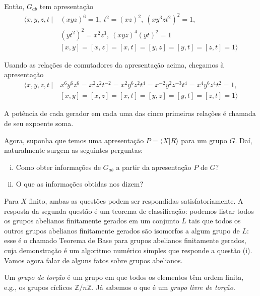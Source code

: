 	\par\vspace{0.3cm} Então, $G_{ab}$ tem apresentação
	\begin{align*}
	\langle x,y,z,t \ | \ &(xyz)^6 = 1, \ t^2 = (xz)^2, \ (xy^3zt^2)^2 = 1, \\ 
	&(yt^2)^2 = x^2z^3, \ (xyz)^4(yt)^2 = 1 \\ 
	&[x,y] = [x,z] = [x,t] = [y,z] = [y,t] = [z,t] = 1\rangle
	\end{align*}
	\par\vspace{0.3cm} Usando as relações de comutadores da apresentação acima, chegamos à apresentação
	\begin{align*}
	\langle x,y,z,t \ | \ &x^6y^6z^6 = x^2z^2t^{-2} = x^2y^6z^2t^4 = x^{-2}y^2z^{-3}t^4 = x^4y^6z^4t^2 = 1, \\
	&[x,y] = [x,z] = [x,t] = [y,z] = [y,t] = [z,t] = 1
	\rangle
	\end{align*}
	\par\vspace{0.3cm} A potência de cada gerador em cada uma das cinco primeiras relações é chamada de seu expoente soma.
	\par\vspace{0.3cm} Agora, suponha que temos uma apresentação $P = \langle X|R \rangle$ para um grupo $G$. Daí, naturalmente surgem as seguintes perguntas:
	\begin{enumerate}[(i)]
		\item Como obter informações de $G_{ab}$ a partir da apresentação $P$ de $G$?
		\item O que as informações obtidas nos dizem? 
	\end{enumerate}
	\par\vspace{0.3cm} Para $X$ finito, ambas as questões podem ser respondidas satisfatoriamente. A resposta da segunda questão é um teorema de classificação: podemos listar todos os grupos abelianos finitamente gerados em um conjunto $L$ tais que todos os outros grupos abelianos finitamente gerados são isomorfos a algum grupo de $L$: esse é o chamado Teorema de Base para grupos abelianos finitamente gerados, cuja demonstração é um algoritmo numérico simples que responde a questão (i). Vamos agora falar de alguns fatos sobre grupos abelianos.
	\par\vspace{0.3cm} Um \textit{grupo de torção} é um grupo em que todos os elementos têm ordem finita, e.g., os grupos cíclicos $\mathbb{Z}/n\mathbb{Z}$. Já sabemos o que é um \textit{grupo livre de torção}.
